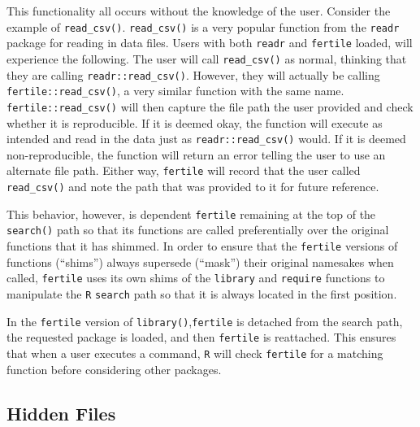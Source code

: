 \documentclass[12pt,twoside]{reedthesis}
\begin{document}
This functionality all occurs without the knowledge of the user. Consider the example of \texttt{read\_csv()}. \texttt{read\_csv()} is a very popular function from the \texttt{readr} package for reading in data files. Users with both \texttt{readr} and \texttt{fertile} loaded, will experience the following. The user will call \texttt{read\_csv()} as normal, thinking that they are calling \texttt{readr::read\_csv()}. However, they will actually be calling \texttt{fertile::read\_csv()}, a very similar function with the same name. \texttt{fertile::read\_csv()} will then capture the file path the user provided and check whether it is reproducible. If it is deemed okay, the function will execute as intended and read in the data just as \texttt{readr::read\_csv()} would. If it is deemed non-reproducible, the function will return an error telling the user to use an alternate file path. Either way, \texttt{fertile} will record that the user called \texttt{read\_csv()} and note the path that was provided to it for future reference.

This behavior, however, is dependent \texttt{fertile} remaining at the top of the \texttt{search()} path so that its functions are called preferentially over the original functions that it has shimmed. In order to ensure that the \texttt{fertile} versions of functions (``shims'') always supersede (``mask'') their original namesakes when called, \texttt{fertile} uses its own shims of the \texttt{library} and \texttt{require} functions to manipulate the \texttt{R} \texttt{search} path so that it is always located in the first position.

In the \texttt{fertile} version of \texttt{library()},\texttt{fertile} is detached from the search path, the requested package is loaded, and then \texttt{fertile} is reattached. This ensures that when a user executes a command, \texttt{R} will check \texttt{fertile} for a matching function before considering other packages.

\hypertarget{hidden-files}{%
\subsection{Hidden Files}\label{hidden-files}}
\end{document}
